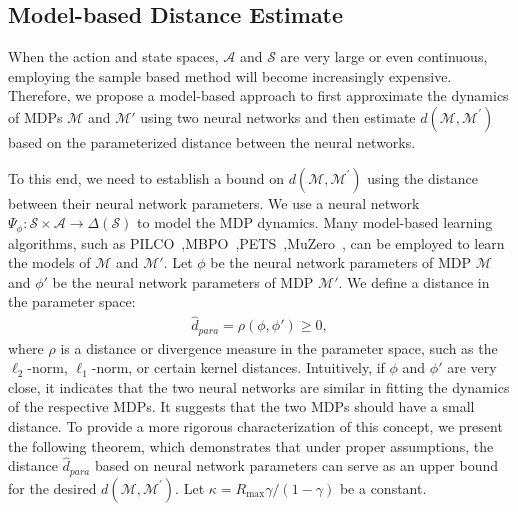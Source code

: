 \subsection{Model-based Distance Estimate}
When the action and state spaces, $\mathcal{A}$ and $\mathcal{S}$ are very large or even continuous, employing the sample based method will become increasingly expensive. Therefore, we propose a model-based approach to first approximate the dynamics of MDPs $\mathcal{M}$ and $\mathcal{M}'$ using two neural networks and then estimate $d(\mathcal{M},\mathcal{M}^{\prime})$ based on the parameterized distance between the neural networks. 


To this end, we need to establish a bound on $d(\mathcal{M},\mathcal{M}^{\prime})$ using the distance between their neural network parameters. 
We use a neural network $\Psi_{\phi}: \mathcal{S} \times \mathcal{A} \rightarrow \Delta(\mathcal{S})$ to model the MDP dynamics.
Many model-based learning algorithms, such as %
PILCO~\cite{deisenroth2011pilco},MBPO~\cite{janner2019trust},PETS~\cite{chua2018deep},MuZero~\cite{schrittwieser2020mastering}, can be employed to learn the models of $\mathcal{M}$ and $\mathcal{M}'$.
Let $\phi$ be the neural network parameters of MDP $\mathcal{M}$ and $\phi'$ be the neural network parameters of MDP $\mathcal{M}'$. We define a distance in the parameter space:
\begin{equation}
\begin{aligned}
   \hat{d}_{para}  =  \rho(\phi,\phi') \geq 0,
\end{aligned}
\end{equation}
where \( \rho \) is a distance or divergence measure in the parameter space, such as the \( \ell_2 \)-norm, \( \ell_1 \)-norm, or certain kernel distances.
Intuitively, if $\phi$ and $\phi'$ are very close, it indicates that the two neural networks are similar in fitting the dynamics of the respective MDPs. It suggests that the two MDPs should have a small distance.
To provide a more rigorous characterization of this concept, we present the following theorem, which demonstrates that under proper assumptions, the distance $\hat{d}_{para}$ based on neural network parameters can serve as an upper bound for the desired $d(\mathcal{M},\mathcal{M}^{\prime})$. Let $\kappa={R_{\max}\gamma}/({1-\gamma})$ be a constant.


